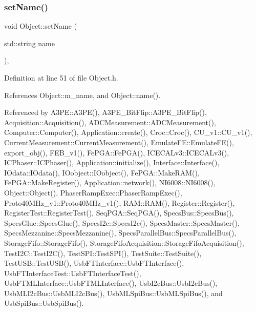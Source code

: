\subsubsection{\texorpdfstring{set\+Name()}{setName()}}
{\footnotesize\ttfamily void Object\+::set\+Name (\begin{DoxyParamCaption}\item[{std\+::string}]{name }\end{DoxyParamCaption})\hspace{0.3cm}{\ttfamily [inline]}, {\ttfamily [inherited]}}



Definition at line 51 of file Object.\+h.



References Object\+::m\+\_\+name, and Object\+::name().



Referenced by A3\+P\+E\+::\+A3\+P\+E(), A3\+P\+E\+\_\+\+Bit\+Flip\+::\+A3\+P\+E\+\_\+\+Bit\+Flip(), Acquisition\+::\+Acquisition(), A\+D\+C\+Measurement\+::\+A\+D\+C\+Measurement(), Computer\+::\+Computer(), Application\+::create(), Croc\+::\+Croc(), C\+U\+\_\+v1\+::\+C\+U\+\_\+v1(), Current\+Measurement\+::\+Current\+Measurement(), Emulate\+F\+E\+::\+Emulate\+F\+E(), export\+\_\+obj(), F\+E\+B\+\_\+v1(), Fe\+P\+G\+A\+::\+Fe\+P\+G\+A(), I\+C\+E\+C\+A\+Lv3\+::\+I\+C\+E\+C\+A\+Lv3(), I\+C\+Phaser\+::\+I\+C\+Phaser(), Application\+::initialize(), Interface\+::\+Interface(), I\+Odata\+::\+I\+Odata(), I\+Oobject\+::\+I\+Oobject(), Fe\+P\+G\+A\+::\+Make\+R\+A\+M(), Fe\+P\+G\+A\+::\+Make\+Register(), Application\+::network(), N\+I6008\+::\+N\+I6008(), Object\+::\+Object(), Phaser\+Ramp\+Exec\+::\+Phaser\+Ramp\+Exec(), Proto40\+M\+Hz\+\_\+v1\+::\+Proto40\+M\+Hz\+\_\+v1(), R\+A\+M\+::\+R\+A\+M(), Register\+::\+Register(), Register\+Test\+::\+Register\+Test(), Seq\+P\+G\+A\+::\+Seq\+P\+G\+A(), Specs\+Bus\+::\+Specs\+Bus(), Specs\+Glue\+::\+Specs\+Glue(), Specs\+I2c\+::\+Specs\+I2c(), Specs\+Master\+::\+Specs\+Master(), Specs\+Mezzanine\+::\+Specs\+Mezzanine(), Specs\+Parallel\+Bus\+::\+Specs\+Parallel\+Bus(), Storage\+Fifo\+::\+Storage\+Fifo(), Storage\+Fifo\+Acquisition\+::\+Storage\+Fifo\+Acquisition(), Test\+I2\+C\+::\+Test\+I2\+C(), Test\+S\+P\+I\+::\+Test\+S\+P\+I(), Test\+Suite\+::\+Test\+Suite(), Test\+U\+S\+B\+::\+Test\+U\+S\+B(), Usb\+F\+T\+Interface\+::\+Usb\+F\+T\+Interface(), Usb\+F\+T\+Interface\+Test\+::\+Usb\+F\+T\+Interface\+Test(), Usb\+F\+T\+M\+L\+Interface\+::\+Usb\+F\+T\+M\+L\+Interface(), Usb\+I2c\+Bus\+::\+Usb\+I2c\+Bus(), Usb\+M\+L\+I2c\+Bus\+::\+Usb\+M\+L\+I2c\+Bus(), Usb\+M\+L\+Spi\+Bus\+::\+Usb\+M\+L\+Spi\+Bus(), and Usb\+Spi\+Bus\+::\+Usb\+Spi\+Bus().


